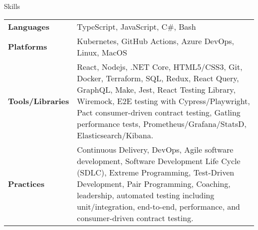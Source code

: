 \begin{section}{Skills}
  \begin{tabularx}{\linewidth}{@{}l X@{}}
    \textbf{Languages} &\small{TypeScript, JavaScript, C\#, Bash} \\
    \textbf{Platforms} &\small{Kubernetes, GitHub Actions, Azure DevOps, Linux, MacOS} \\
    \textbf{Tools/Libraries} &\small{React, Nodejs, .NET Core, HTML5/CSS3, Git, Docker, Terraform, SQL, Redux, React Query, GraphQL, Make, Jest, React Testing Library, Wiremock, E2E testing with Cypress/Playwright, Pact consumer-driven contract testing, Gatling performance tests, Prometheus/Grafana/StatsD, Elasticsearch/Kibana.} \\
    \textbf{Practices} &\small{Continuous Delivery, DevOps, Agile software development, Software Development Life Cycle (SDLC), Extreme Programming, Test-Driven Development, Pair Programming, Coaching, leadership, automated testing including unit/integration, end-to-end, performance, and consumer-driven contract testing.} \\
  \end{tabularx}
\end{section}
